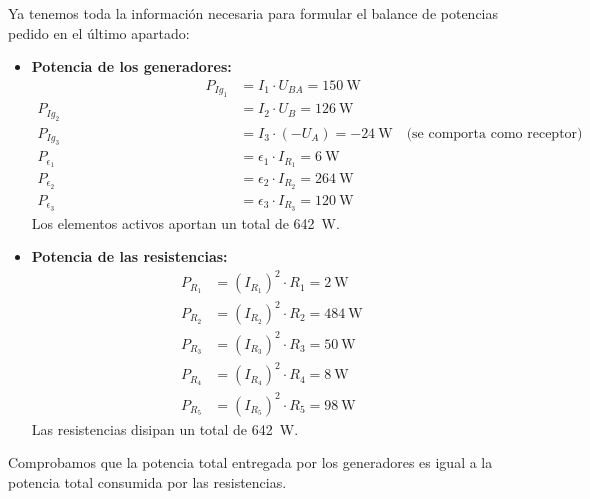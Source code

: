 \documentclass[10pt]{article}
\begin{document}
Ya tenemos toda la información necesaria para formular el balance de potencias pedido en el último apartado:

\begin{itemize}
\item \textbf{Potencia de los generadores:}
  \begin{align*}
    \qquad\qquad\qquad\qquad\qquad\qquad P_{Ig_1} &= I_1 \cdot U_{BA} = \qty{150}{\watt}\\
    P_{Ig_2} &= I_2 \cdot U_{B} = \qty{126}{\watt}\\
    P_{Ig_3} &= I_3 \cdot (-U_{A}) = - \qty{24}{\watt} \quad \text{(se comporta como receptor)}\\
    P_{\epsilon_1} &= \epsilon_1 \cdot I_{R_1} = \qty{6}{\watt}\\
    P_{\epsilon_2} &= \epsilon_2 \cdot I_{R_2} = \qty{264}{\watt}\\
    P_{\epsilon_3} &= \epsilon_3 \cdot I_{R_3} = \qty{120}{\watt}
  \end{align*}
  Los elementos activos aportan un total de \qty{642}{\watt}.
\item \textbf{Potencia de las resistencias:}
  \begin{align*}
    P_{R_1} &= (I_{R_1})^2 \cdot R_1 = \qty{2}{\watt}\\
    P_{R_2} &= (I_{R_2})^2 \cdot R_2 = \qty{484}{\watt}\\
    P_{R_3} &= (I_{R_3})^2 \cdot R_3 = \qty{50}{\watt}\\
    P_{R_4} &= (I_{R_4})^2 \cdot R_4 = \qty{8}{\watt}\\
    P_{R_5} &= (I_{R_5})^2 \cdot R_5 = \qty{98}{\watt}
  \end{align*}
  Las resistencias disipan un total de \SI{642}{\watt}.
\end{itemize}

Comprobamos que la potencia total entregada por los generadores es igual a la potencia total consumida por las resistencias.
\end{document}
